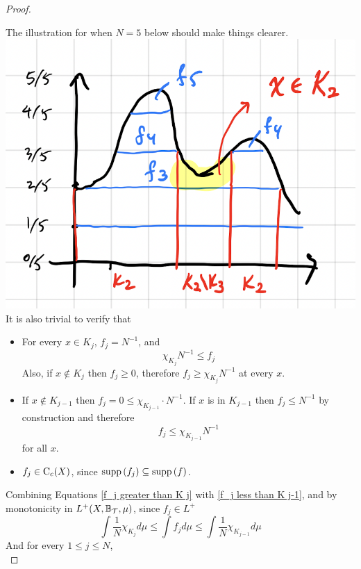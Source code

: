 \documentclass[../../main.tex]{subfiles}
\begin{document}
\begin{proof}
\begin{itemize}
    \end{itemize}
    The illustration for when $N=5$ below should make things clearer.\\
    \includegraphics[scale=0.50]{FollandTheorem7_2.png}
    \\ It is also trivial to verify that
    \begin{itemize}
        \item For every $x\in K_j$, $f_j=N^{-1}$, and
        \begin{equation}\label{f_j greater than K j}
        \chi_{K_{j}}N^{-1}\leq f_j
        \end{equation}
        Also, if $x\notin K_j$ then $f_j\geq 0$, therefore $f_j\geq \chi_{K_j}N^{-1}$ at every $x$.
        \item If $x\notin K_{j-1}$ then $f_j = 0\leq \chi_{K_{j-1}}\cdot N^{-1}$. If $x$ is in $K_{j-1}$ then $f_j\leq N^{-1}$ by construction and therefore
        \begin{equation}\label{f_j less than K j-1}
        f_j\leq \chi_{K_{j-1}}N^{-1}
        \end{equation}
        for all $x$.
        \item $f_j\in\operatorname{C}_c({X})$, since $\operatorname{supp}{(f_j)}\subseteq \operatorname{supp}{(f)}$.
    \end{itemize}
   Combining Equations \eqref{f_j greater than K j} with \eqref{f_j less than K j-1}, and by monotonicity in $L^+(X,\mathbb{B}_{\mathcal{T}},\mu)$, since $f_j\in L^+$
   \[
   \int \dfrac{1}{N}\chi_{K_j}d\mu\leq \int f_jd\mu\leq\int \dfrac{1}{N}\chi_{K_{j-1}}d\mu
   \]
   And for every $1\leq j\leq N$, 
   \begin{equation}\label{integral fj estimate}

\end{equation}
\end{proof}
\end{document}
